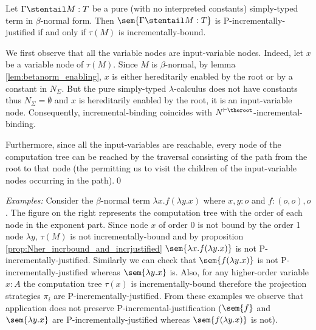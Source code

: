 \begin{corollary}
\label{cor:Nher_incrbound_iff_incrjustified}
  Let $\Gamma \stentail M : T$ be a pure (\ie with no interpreted constants) simply-typed term in $\beta$-normal form. Then $\sem{\Gamma \stentail M : T}$ is P-incrementally-justified if and only if $\tau(M)$ is incrementally-bound.
\end{corollary}
\proof We first observe that all the variable nodes are
input-variable nodes. Indeed, let $x$ be a variable node of
$\tau(M)$. Since $M$ is $\beta$-normal, by lemma
\ref{lem:betanorm_enabling}, $x$ is either hereditarily enabled by
the root or by a constant in $N_\Sigma$. But the pure simply-typed
$\lambda$-calculus does not have constants thus $N_\Sigma =
\emptyset$ and $x$ is hereditarily enabled by the root, \ie it is an
input-variable node. Consequently, incremental-binding coincides
with $N^{\vdash \theroot}$-incremental-binding.

Furthermore, since all the input-variables are reachable, every node
of the computation tree can be reached by the traversal consisting
of the path from the root to that node (the 
permitting us to visit the children of the input-variable nodes
occurring in the path).\qed
\smallskip

 \noindent \emph{Examples:} Consider the $\beta$-normal term
$\lambda x . f (\lambda y .x)$ where $x,y:o$ and $f:(o,o),o$. The
figure on the right represents the computation tree with the order
of each node in the exponent part. Since node $x$ of order $0$ is
not bound by the order 1 node $\lambda y$, $\tau(M)$ is not
incrementally-bound and by proposition
\ref{prop:Nher_incrbound_and_incrjustified} $\sem{\lambda x . f
(\lambda y .x)}$ is not P-incrementally-justified. Similarly we can
check that $\sem{f (\lambda y .x)}$ is not P-incrementally-justified
whereas $\sem{\lambda y. x}$ is. Also, for any higher-order variable
$x:A$ the computation tree $\tau(x)$ is incrementally-bound
therefore the projection strategies $\pi_i$ are
P-incrementally-justified. From these examples we observe that
application does not preserve P-incremental-justification ($\sem{f}$
and $\sem{\lambda y. x}$ are P-incrementally-justified whereas
$\sem{f (\lambda y .x)}$ is not).
\smallskip

